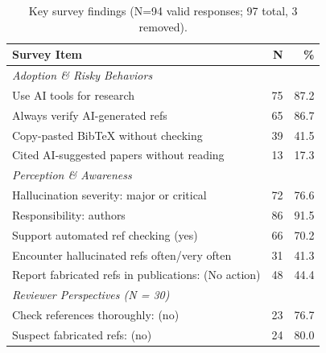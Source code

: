 \begin{table}[t]
    \centering
    \caption{Key survey findings (N=94 valid responses; 97 total, 3 removed).}
    \label{tab:survey_details}
    \small
    \begin{tabular}{lrr}
    \toprule
    \textbf{Survey Item} & \textbf{N} & \textbf{\%} \\
    \midrule
    \multicolumn{3}{l}{\textit{Adoption \& Risky Behaviors}} \\
    \midrule
    Use AI tools for research & 75 & 87.2 \\
    \rowcolor{tableRowLight}
    Always verify AI-generated refs & 65 & 86.7 \\
    Copy-pasted BibTeX without checking & 39 & 41.5 \\
    \rowcolor{tableRowLight}
    Cited AI-suggested papers without reading & 13 & 17.3 \\
    \midrule
    \multicolumn{3}{l}{\textit{Perception \& Awareness}} \\
    \midrule
    Hallucination severity: major or critical & 72 & 76.6 \\
    \rowcolor{tableRowLight}
    Responsibility: authors & 86 & 91.5 \\
    Support automated ref checking (yes) & 66 & 70.2 \\
    \rowcolor{tableRowLight}
    Encounter hallucinated refs often/very often & 31 & 41.3 \\
    Report fabricated refs in publications: (No action) & 48 & 44.4 \\
    \midrule
    \multicolumn{3}{l}{\textit{Reviewer Perspectives (N = 30)}} \\
    \midrule
    Check references thoroughly: (no) & 23 & 76.7  \\
    \rowcolor{tableRowLight}
    Suspect fabricated refs: (no) & 24 & 80.0  \\
    \bottomrule
    \end{tabular}
\end{table}

